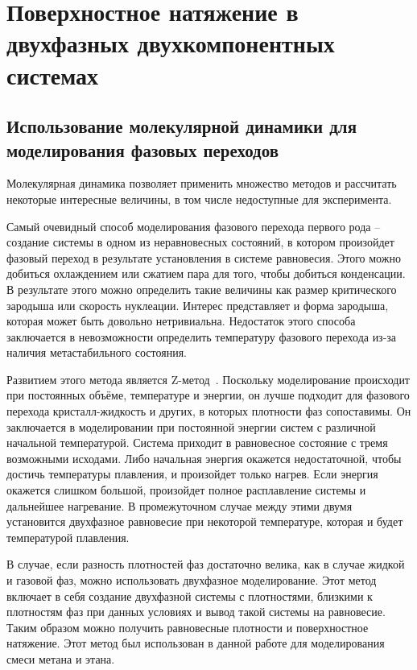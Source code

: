 \chapter{Поверхностное натяжение в двухфазных двухкомпонентных системах}\label{ch:ch3}

\section{Использование молекулярной динамики для моделирования фазовых переходов}

Молекулярная динамика позволяет применить множество методов и рассчитать некоторые интересные величины, в том числе недоступные для эксперимента.

Самый очевидный способ моделирования фазового перехода первого рода \--- создание системы в одном из неравновесных состояний, в котором произойдет фазовый переход в результате установления в системе равновесия.  Этого можно добиться охлаждением или сжатием пара для того, чтобы добиться конденсации. В результате этого можно определить такие величины как размер критического зародыша или скорость нуклеации. Интерес представляет и форма зародыша, которая может быть довольно нетривиальна. Недостаток этого способа заключается в невозможности определить температуру фазового перехода из-за наличия метастабильного состояния.

Развитием этого метода является Z-метод~\cite{Belonoshko2006}. Поскольку моделирование происходит при постоянных объёме, температуре и энергии, он лучше подходит для фазового перехода кристалл-жидкость и других, в которых плотности фаз сопоставимы. Он заключается в моделировании при постоянной энергии систем с различной начальной температурой. Система приходит в равновесное состояние с тремя возможными исходами. Либо начальная энергия окажется недостаточной, чтобы достичь температуры плавления, и произойдет только нагрев. Если энергия окажется слишком большой, произойдет полное расплавление системы и дальнейшее нагревание. В промежуточном случае между этими двумя установится двухфазное равновесие при некоторой температуре, которая и будет температурой плавления. 

В случае, если разность плотностей фаз достаточно велика, как в случае жидкой и газовой фаз, можно использовать двухфазное моделирование. Этот метод включает в себя создание двухфазной системы с плотностями, близкими к плотностям фаз при данных условиях и вывод такой системы на равновесие. Таким образом можно получить равновесные плотности и поверхностное натяжение. Этот метод был использован в данной работе для моделирования смеси метана и этана. 

